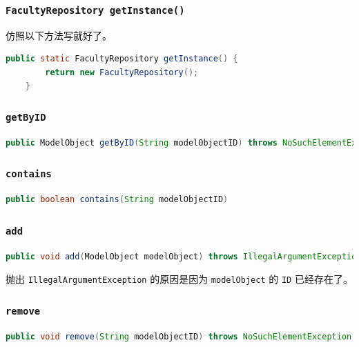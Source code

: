 \documentclass[hyperref,UTF8,12pt,a4paper]{ctexart}
\begin{document}
\subsubsection{\texttt{FacultyRepository getInstance()}}

仿照以下方法写就好了。

\begin{lstlisting}[language=Java]
	public static FacultyRepository getInstance() {
		return new FacultyRepository();
	}
\end{lstlisting}

\subsubsection{\texttt{getByID}}

\begin{lstlisting}[language=Java]
    public ModelObject getByID(String modelObjectID) throws NoSuchElementException
\end{lstlisting}

\subsubsection{\texttt{contains}}

\begin{lstlisting}[language=Java]
	public boolean contains(String modelObjectID)
\end{lstlisting}

\subsubsection{\texttt{add}}

\begin{lstlisting}[language=Java]
    public void add(ModelObject modelObject) throws IllegalArgumentException
\end{lstlisting}

抛出 \texttt{IllegalArgumentException} 的原因是因为 \texttt{modelObject} 的 \texttt{ID} 已经存在了。

\subsubsection{\texttt{remove}}

\begin{lstlisting}[language=Java]
	public void remove(String modelObjectID) throws NoSuchElementException
\end{lstlisting}
\end{document}
